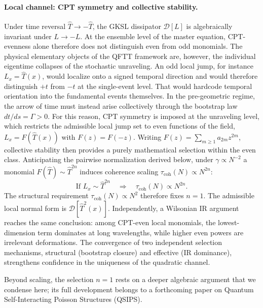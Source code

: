 \documentclass[12pt,a4paper]{article}
\numberwithin{equation}{section}
\begin{document}
\paragraph{Local channel: CPT symmetry and collective stability.}
Under time reversal $\hat T \to -\hat T$, the GKSL dissipator
$\mathcal{D}[L]$ is algebraically invariant under $L \to -L$. At the
ensemble level of the master equation, CPT-evenness alone therefore does
not distinguish even from odd monomials. The physical elementary objects
of the QFTT framework are, however, the individual eigentime collapses of
the stochastic unraveling. An odd local jump, for instance
$L_x = \hat T(x)$, would localize onto a signed temporal direction and
would therefore distinguish $+t$ from $-t$ at the single-event level.
That would hardcode temporal orientation into the fundamental events
themselves. In the pre-geometric regime, the arrow of time must instead
arise collectively through the bootstrap law $dt/ds = \Gamma > 0$. For
this reason, CPT symmetry is imposed at the unraveling level, which
restricts the admissible local jump set to even functions of the field,
$L_x = F(\hat T(x))$ with $F(z)=F(-z)$. Writing
$F(z) = \sum_{m \ge 1} a_{2m} z^{2m}$, collective stability then provides
a purely mathematical selection within the even class. Anticipating the pairwise normalization derived below, under $\gamma \propto N^{-2}$ a monomial $F(\hat T) \sim \hat T^{2n}$ induces coherence scaling $\tau_{\mathrm{coh}}(N) \propto N^{2n}$:
\begin{equation}
\text{If } L_x \sim \hat{T}^{2n} \quad\Rightarrow\quad
\tau_{\mathrm{coh}}(N)\propto N^{2n}.
\label{eq:scaling-condition}
\end{equation}
The structural requirement $\tau_{\mathrm{coh}}(N) \propto N^2$ therefore fixes $n = 1$. The admissible local normal form is $\mathcal{D}[\hat T^2(x)]$. Independently, a Wilsonian IR argument reaches the same conclusion: among CPT-even local monomials, the lowest-dimension term dominates at long wavelengths, while higher even powers are irrelevant deformations. The convergence of two independent selection mechanisms, structural (bootstrap closure) and effective (IR dominance), strengthens confidence in the uniqueness of the quadratic channel.

Beyond scaling, the selection $n = 1$ rests on a deeper algebraic argument that we condense here; its full development belongs to a forthcoming paper on Quantum Self-Interacting Poisson Structures (QSIPS).
\end{document}

